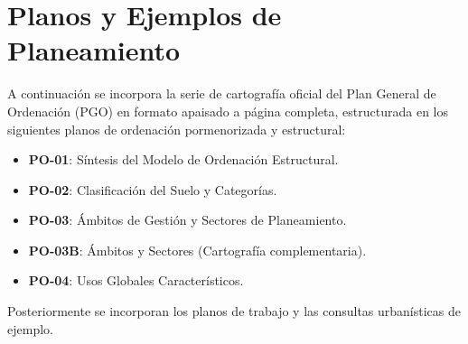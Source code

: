 \section{Planos y Ejemplos de Planeamiento}

A continuación se incorpora la serie de cartografía oficial del Plan General de Ordenación (PGO) en formato apaisado a página completa, estructurada en los siguientes planos de ordenación pormenorizada y estructural:
\begin{itemize}
  \item \textbf{PO-01}: Síntesis del Modelo de Ordenación Estructural.
  \item \textbf{PO-02}: Clasificación del Suelo y Categorías.
  \item \textbf{PO-03}: Ámbitos de Gestión y Sectores de Planeamiento.
  \item \textbf{PO-03B}: Ámbitos y Sectores (Cartografía complementaria).
  \item \textbf{PO-04}: Usos Globales Característicos.
\end{itemize}
Posteriormente se incorporan los planos de trabajo y las consultas urbanísticas de ejemplo.














